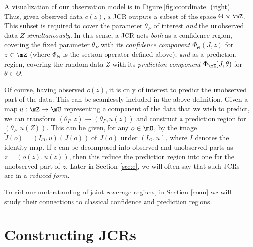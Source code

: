 \documentclass[english]{article}
\begin{document}



A visualization of our observation model is in Figure \ref{fig:coordinate} (right). 
Thus, 
given observed data $o(z)$, 
a JCR outputs a subset of the space $\Theta \times \mZ$.
This subset is required to cover the parameter $\theta_P$ of interest \emph{and} the unobserved data $Z$ \emph{simultaneously}.
In this sense, a JCR acts \emph{both} as a confidence region, covering the fixed parameter $\theta_P$ with its \emph{confidence component} $\Phi_{\Theta}(J,z)$ for $z \in \mZ$ (where $\Phi_{\Theta}$ is the section operator defined above); 
\emph{and} as a prediction region, covering the random data $Z$ with its \emph{prediction component} $\Phi_{\mZ}(J,\theta)$ for $\theta \in \Theta$.

Of course, having observed $o(z)$, it is only of interest to predict the unobserved part of the data. 
This can be seamlessly included in the above definition.
Given a map $u:\mZ\to\mU$ representing a component of the data that we wish to predict, 
we can transform $(\theta_P,z)\to (\theta_P,u(z))$
and construct a prediction region for $(\theta_P,u(Z))$.
This can be given, for any $o\in \mO$, 
by 
the image 
$\tilde J(o) = (I_\Theta, u) (J(o))$
of $J(o)$ under $(I_\Theta, u)$, 
where $I$ denotes the identity map. 
If $z$ can be decomposed into observed and unobserved parts as $z = (o(z), u(z))$,
then this
reduce the prediction region into one for the unobserved part of $z$. 
Later in Section \ref{sec:c}, we will often say that such JCRs are in a \emph{reduced form}.


To aid our understanding of joint coverage regions, in Section \ref{conn} we will study their connections to classical confidence and prediction regions. 

\section{Constructing JCRs}\label{sec:JCR-construction}
\label{sec:c}
\end{document}
